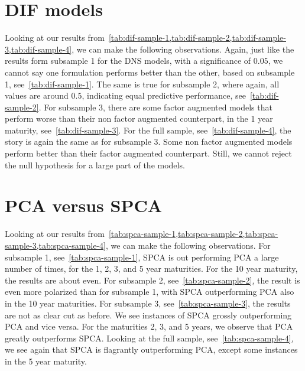 \section{DIF models}
Looking at our results from~\cref{tab:dif-sample-1,tab:dif-sample-2,tab:dif-sample-3,tab:dif-sample-4}, we can make the following observations. 
Again, just like the results form subsample 1 for the DNS models, with a significance of $0.05$, we cannot say one formulation performs better than the other, based on subsample 1, see~\cref{tab:dif-sample-1}. 
The same is true for subsample 2, where again, all values are around $0.5$, indicating equal predictive performance, see~\cref{tab:dif-sample-2}.
For subsample 3, there are some factor augmented models that perform worse than their non factor augmented counterpart, in the 1 year maturity, see~\cref{tab:dif-sample-3}. 
For the full sample, see~\cref{tab:dif-sample-4}, the story is again the same as for subsample 3.
Some non factor augmented models perform better than their factor augmented counterpart. 
Still, we cannot reject the null hypothesis for a large part of the models.

\section{PCA versus SPCA}
Looking at our results from~\cref{tab:spca-sample-1,tab:spca-sample-2,tab:spca-sample-3,tab:spca-sample-4}, we can make the following observations. 
For subsample 1, see~\cref{tab:spca-sample-1}, SPCA is out performing PCA a large number of times, for the 1, 2, 3, and 5 year maturities.
For the 10 year maturity, the results are about even.
For subsample 2, see~\cref{tab:spca-sample-2}, the result is even more polarized than for subsample 1, with SPCA outperforming PCA also in the 10 year maturities.
For subsample 3, see~\cref{tab:spca-sample-3}, the results are not as clear cut as before.
We see instances of SPCA grossly outperforming PCA and vice versa. 
For the maturities 2, 3, and 5 years, we observe that PCA greatly outperforms SPCA. 
Looking at the full sample, see~\cref{tab:spca-sample-4}, we see again that SPCA is flagrantly outperforming PCA, except some instances in the 5 year maturity. 
